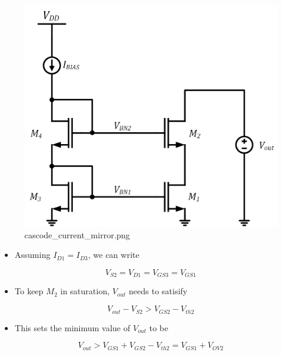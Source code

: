 \documentclass[11pt]{article}
\providecommand{\tightlist}{%
      \setlength{\itemsep}{0pt}\setlength{\parskip}{0pt}}
\begin{document}
    \begin{figure}
\centering
\includegraphics{cascode_current_mirror.png}
\caption{cascode\_current\_mirror.png}
\end{figure}

    \begin{itemize}
\tightlist
\item
  Assuming \(I_{D1} = I_{D3}\), we can write
\end{itemize}

\begin{equation}
V_{S2} = V_{D1} = V_{GS3} = V_{GS1}
\end{equation}

\begin{itemize}
\tightlist
\item
  To keep \(M_2\) in saturation, \(V_{out}\) needs to satisify
\end{itemize}

\begin{equation}
V_{out} - V_{S2} > V_{GS2} - V_{th2} 
\end{equation}

\begin{itemize}
\tightlist
\item
  This sets the minimum value of \(V_{out}\) to be
\end{itemize}

\begin{equation}
V_{out} > V_{GS1} + V_{GS2} - V_{th2} = V_{GS1} + V_{OV2}
\end{equation}
\end{document}
